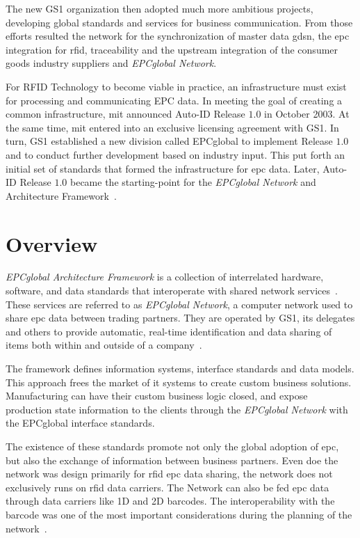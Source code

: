 The new GS1 organization then adopted much more ambitious projects, developing global standards and services for business communication.
From those efforts resulted the network for the synchronization of master data \ac{gdsn}, the \ac{epc} integration for \ac{rfid}, traceability and the upstream integration of the consumer goods industry suppliers and \emph{EPCglobal Network}.

For RFID Technology to become viable in practice, an infrastructure must exist for processing and communicating EPC data. In meeting the goal of creating a common infrastructure, \ac{mit} announced Auto-ID Release $1.0$ in October 2003. At the same time, \ac{mit} entered into an exclusive licensing agreement with GS1.
In turn, GS1 established a new division called EPCglobal to implement Release $1.0$ and to conduct further development based on industry input. This put forth an initial set of standards that formed the infrastructure for \ac{epc} data. Later, Auto-ID Release $1.0$ became the starting-point for the \emph{EPCglobal Network} and Architecture Framework~\cite{GlobalRFIDValue}.

\section{Overview}


\emph{EPCglobal Architecture Framework} is a collection of interrelated hardware, software, and data standards that interoperate with shared network services~\cite{GS1EPCglobalArchitecture}.
These services are referred to as \emph{EPCglobal Network}, a computer network used to share \ac{epc} data between trading partners.
They are operated by GS1, its delegates and others to provide automatic, real-time identification and data sharing of items both within and outside of a company~\cite{lahiriRFIDSourcebook2005}.

The framework defines information systems, interface standards and data models. This approach frees the market of \ac{it} systems to create custom business solutions. Manufacturing can have their custom business logic closed, and expose production state information to the clients through the \emph{EPCglobal Network} with the EPCglobal interface standards.

The existence of these standards promote not only the global adoption of \ac{epc}, but also the exchange of information between business partners.
Even doe the network was design primarily for \ac{rfid} \ac{epc} data sharing, the network does not exclusively runs on \ac{rfid} data carriers. The Network can also be fed \ac{epc} data through data carriers like 1D and 2D barcodes. The interoperability with the barcode was one of the most important considerations during the planning of the network~\cite{RFIDBarcodeInteroperability}.


